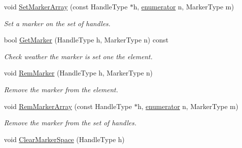 \begin{DoxyCompactItemize}
void \hyperlink{classINMOST_1_1Mesh_a84ff5329978e77876ca6b1b3ed9b5c39}{Set\-Marker\-Array} (const Handle\-Type $\ast$h, \hyperlink{classINMOST_1_1Storage_ae333dfced6fa9cfde0c8e7dcf1b0cc2b}{enumerator} n, Marker\-Type m)
\begin{DoxyCompactList}\small\item\em Set a marker on the set of handles. \end{DoxyCompactList}\item 
bool \hyperlink{classINMOST_1_1Mesh_a2c8a00522e2b06a0b59e25cae119a237}{Get\-Marker} (Handle\-Type h, Marker\-Type n) const 
\begin{DoxyCompactList}\small\item\em Check weather the marker is set one the element. \end{DoxyCompactList}\item 
void \hyperlink{classINMOST_1_1Mesh_aa758ff129bf79eff3c446946e276006c}{Rem\-Marker} (Handle\-Type h, Marker\-Type n)
\begin{DoxyCompactList}\small\item\em Remove the marker from the element. \end{DoxyCompactList}\item 
void \hyperlink{classINMOST_1_1Mesh_a14f8614996be1f7dd81825a447e9f4e8}{Rem\-Marker\-Array} (const Handle\-Type $\ast$h, \hyperlink{classINMOST_1_1Storage_ae333dfced6fa9cfde0c8e7dcf1b0cc2b}{enumerator} n, Marker\-Type m)
\begin{DoxyCompactList}\small\item\em Remove the marker from the set of handles. \end{DoxyCompactList}\item 
\hypertarget{classINMOST_1_1Mesh_a4b688c3af40eeef80d7d365c56be193f}{void \hyperlink{classINMOST_1_1Mesh_a4b688c3af40eeef80d7d365c56be193f}{Clear\-Marker\-Space} (Handle\-Type h)}\label{classINMOST_1_1Mesh_a4b688c3af40eeef80d7d365c56be193f}


\end{DoxyCompactItemize}

